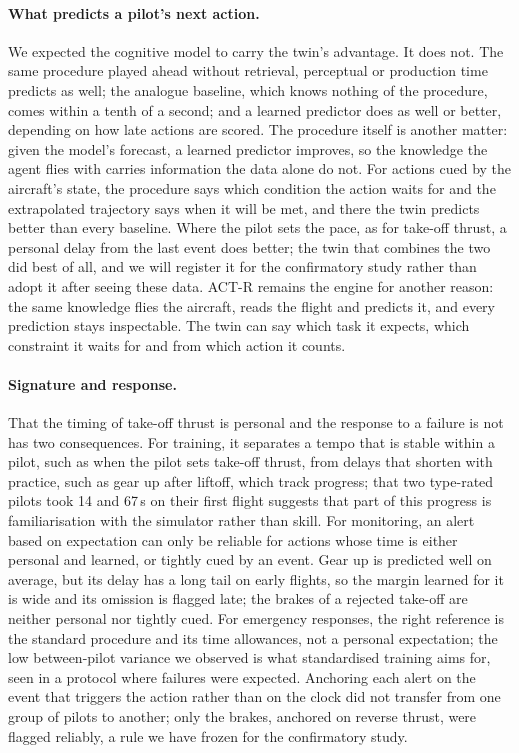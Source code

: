 \documentclass{llncs}
\begin{document}
\paragraph{What predicts a pilot's next action.} We expected the cognitive model to carry the twin's advantage. It does not. The same
procedure played ahead without retrieval, perceptual or production time predicts as well; the analogue baseline, which knows nothing of
the procedure, comes within a tenth of a second; and a learned predictor does as well or better, depending on how late actions are
scored. The procedure itself is another matter: given the model's forecast, a learned predictor improves, so the knowledge the agent
flies with carries information the data alone do not. For actions cued by the aircraft's state, the procedure says which condition the
action waits for and the extrapolated trajectory says when it will be met, and there the twin predicts better than every baseline.
Where the pilot sets the pace, as for take-off thrust, a personal delay from the last event does better; the twin that combines the two
did best of all, and we will register it for the confirmatory study rather than adopt it after seeing these data. ACT-R remains the engine for another reason: the same
knowledge flies the aircraft, reads the flight and predicts it, and every prediction stays inspectable. The twin can say which task it
expects, which constraint it waits for and from which action it counts.

\paragraph{Signature and response.} That the timing of take-off thrust is personal and the response to a failure is not has two
consequences. For training, it separates a tempo that is stable within a pilot, such as when the pilot sets take-off thrust, from delays
that shorten with practice, such as gear up after liftoff, which track progress; that two type-rated pilots took 14 and 67\,s on their
first flight suggests that part of this progress is familiarisation with the simulator rather than skill. For monitoring, an alert based
on expectation can only be reliable for actions whose time is either personal and learned, or tightly cued by an event. Gear up is
predicted well on average, but its delay has a long tail on early flights, so the margin learned for it is wide and its omission is
flagged late; the brakes of a rejected take-off are neither personal nor tightly cued. For emergency responses, the right reference is the
standard procedure and its time allowances, not a personal expectation; the low between-pilot variance we observed is what standardised
training aims for, seen in a protocol where failures were expected. Anchoring each alert on the event that triggers the action rather
than on the clock did not transfer from one group of pilots to another; only the brakes, anchored on reverse thrust, were flagged
reliably, a rule we have frozen for the confirmatory study.
\end{document}
